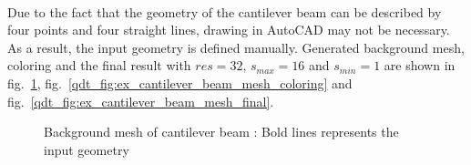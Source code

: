 \paragraph{}
Due to the fact that the geometry of the cantilever beam can be described by four points and four straight lines, drawing in AutoCAD may not be necessary.
As a result, the input geometry is defined manually.
Generated background mesh, coloring and the final result with $res=32$, $s_{max}=16$ and $s_{min}=1$ are shown in fig.~\ref{qdt_fig:ex_cantilever_beam_background_mesh}, fig.~\ref{qdt_fig:ex_cantilever_beam_mesh_coloring} and fig.~\ref{qdt_fig:ex_cantilever_beam_mesh_final}.

    \begin{figure}
        \centering
        \caption[Background mesh of cantilever beam]{Background mesh of cantilever beam : Bold lines represents the input geometry}
        \label{qdt_fig:ex_cantilever_beam_background_mesh}
    \end{figure}

